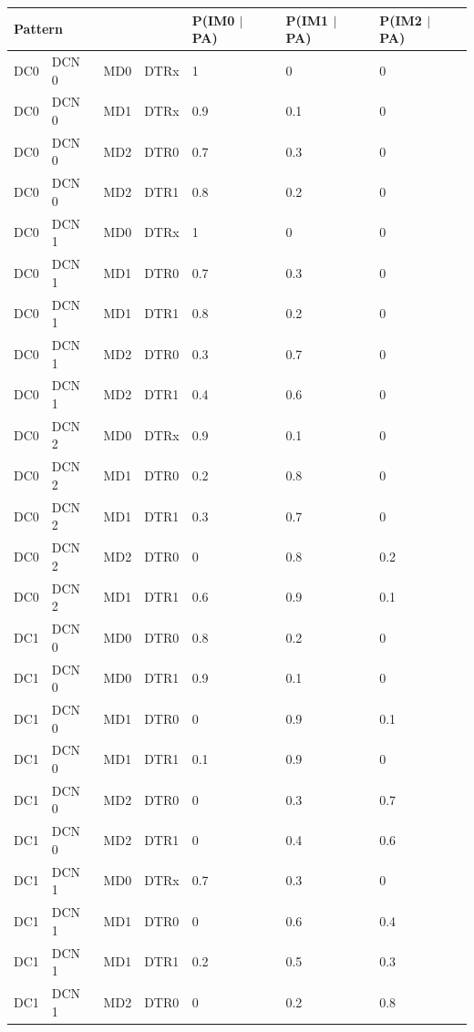 \documentclass[review]{elsarticle}
\begin{document}
	\begin{table}[!htbp]
		\centering
		\normalsize
		\begin{tabular}{|l|l|l|l|l|l|l|}
			\hline
			\multicolumn{4}{|l|}{Pattern}    & P(IM0 $\mid$ PA) & P(IM1 $\mid$ PA) & P(IM2 $\mid$ PA)\\
			\hline
			DC0 & DCN 0 & MD0 & DTRx & 1 & 0 & 0\\
			\hline
			DC0 & DCN 0 & MD1 & DTRx & 0.9 & 0.1 & 0\\
			\hline
			DC0 & DCN 0 & MD2 & DTR0 & 0.7 & 0.3 & 0\\
			\hline
			DC0 & DCN 0 & MD2 & DTR1 & 0.8 & 0.2 & 0\\
			\hline
			DC0 & DCN 1 & MD0 & DTRx & 1 & 0 & 0\\
			\hline
			DC0 & DCN 1 & MD1 & DTR0 & 0.7 & 0.3 & 0\\
			\hline
			DC0 & DCN 1 & MD1 & DTR1 & 0.8 & 0.2 & 0\\
			\hline
			DC0 & DCN 1 & MD2 & DTR0 & 0.3 & 0.7 & 0\\
			\hline
			DC0 & DCN 1 & MD2 & DTR1 & 0.4 & 0.6 & 0\\
			\hline
			DC0 & DCN 2 & MD0 & DTRx & 0.9 & 0.1 & 0\\
			\hline
			DC0 & DCN 2 & MD1 & DTR0 & 0.2 & 0.8 & 0\\
			\hline
			DC0 & DCN 2 & MD1 & DTR1 & 0.3 & 0.7 & 0\\
			\hline
			DC0 & DCN 2 & MD2 & DTR0 & 0 & 0.8 & 0.2\\
			\hline
			DC0 & DCN 2 & MD1 & DTR1 & 0.6 & 0.9 & 0.1\\
			\hline
			DC1 & DCN 0 & MD0 & DTR0 & 0.8 & 0.2 & 0\\
			\hline
			DC1 & DCN 0 & MD0 & DTR1 & 0.9 & 0.1 & 0\\
			\hline
			DC1 & DCN 0 & MD1 & DTR0 & 0 & 0.9 & 0.1\\
			\hline
			DC1 & DCN 0 & MD1 & DTR1 & 0.1 & 0.9 & 0\\
			\hline
			DC1 & DCN 0 & MD2 & DTR0 & 0 & 0.3 & 0.7\\
			\hline
			DC1 & DCN 0 & MD2 & DTR1 & 0 & 0.4 & 0.6\\
			\hline
			DC1 & DCN 1 & MD0 & DTRx & 0.7 & 0.3 & 0\\
			\hline
			DC1 & DCN 1 & MD1 & DTR0 & 0 & 0.6 & 0.4\\
			\hline
			DC1 & DCN 1 & MD1 & DTR1 & 0.2 & 0.5 & 0.3\\
			\hline
			DC1 & DCN 1 & MD2 & DTR0 & 0 & 0.2 & 0.8\\

\end{tabular}
\end{table}
\end{document}
